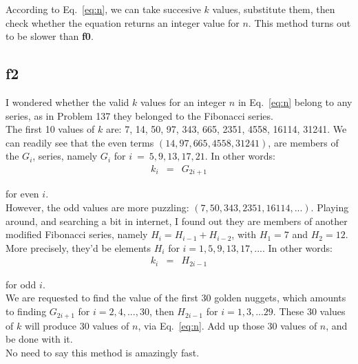 \documentclass[english]{article}
\begin{document}
According to Eq.~\ref{eq:n}, we can take succesive $k$ values, substitute them, then check whether the equation returns an integer value for $n$. This method turns out to be slower than {\bf f0}.

\subsection{f2}

I wondered whether the valid $k$ values for an integer $n$ in Eq.~\ref{eq:n} belong to any series, as in Problem 137 they belonged to the Fibonacci series.\\

The first 10 values of $k$ are: 7, 14, 50, 97, 343, 665, 2351, 4558, 16114, 31241. We can readily see that the even terms $(14, 97, 665, 4558, 31241)$, are members of the $G_i$, series, namely $G_i$ for $i~=~5, 9, 13, 17, 21$. In other words:\\

\begin{eqnarray}
k_i & = & G_{2i+1}
\end{eqnarray}

for even $i$.\\

However, the odd values are more puzzling: $(7,50,343,2351,16114, ...)$. Playing around, and searching a bit in internet, I found out they are members of another modified Fibonacci series, namely $H_i = H_{i-1} + H_{i-2}$, with $H_1 = 7$ and $H_2 = 12$. More precisely, they'd be elements $H_i$ for $i = 1, 5, 9, 13, 17, ...$. In other words:\\

\begin{eqnarray}
k_i & = & H_{2i-1}
\end{eqnarray}

for odd $i$.\\

We are requested to find the value of the first 30 golden nuggets, which amounts to finding $G_{2i+1}$ for $i = 2, 4, ..., 30$, then $H_{2i-1}$ for $i = 1, 3, ... 29$. These 30 values of $k$ will produce 30 values of $n$, via Eq.~\ref{eq:n}. Add up those 30 values of $n$, and be done with it.\\

No need to say this method is amazingly fast.
\end{document}
